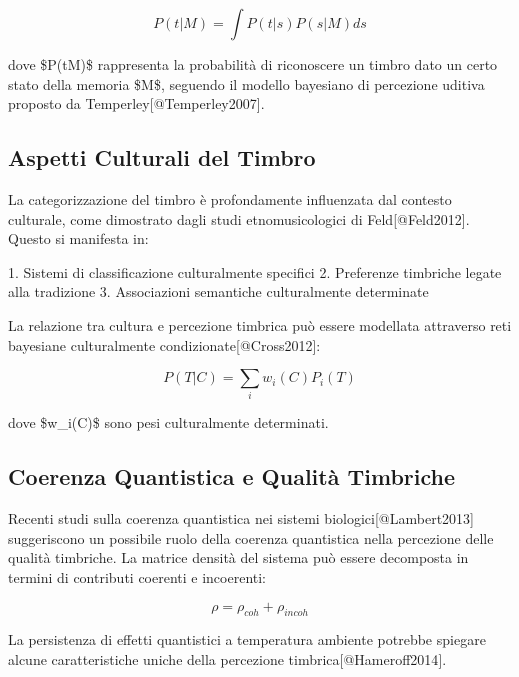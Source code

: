 \documentclass[a4paper,11pt]{article}
\begin{document}
\begin{displaymath}
P(t|M) = \int P(t|s)P(s|M)ds
\end{displaymath}

dove \$P(t\textbar{}M)\$ rappresenta la probabilità di riconoscere un timbro dato
un certo stato della memoria \$M\$, seguendo il modello bayesiano di
percezione uditiva proposto da Temperley{[}@Temperley2007{]}.

\subsection{Aspetti Culturali del Timbro}\hypertarget{aspetti-culturali-del-timbro}{}\label{aspetti-culturali-del-timbro}

La categorizzazione del timbro è profondamente influenzata dal contesto
culturale, come dimostrato dagli studi etnomusicologici di
Feld{[}@Feld2012{]}. Questo si manifesta in:

1. Sistemi di classificazione culturalmente specifici 2. Preferenze
timbriche legate alla tradizione 3. Associazioni semantiche
culturalmente determinate

La relazione tra cultura e percezione timbrica può essere modellata
attraverso reti bayesiane culturalmente condizionate{[}@Cross2012{]}:

\begin{displaymath}
P(T|C) = \sum_i w_i(C)P_i(T)
\end{displaymath}

dove \$w\_i(C)\$ sono pesi culturalmente determinati.

\subsection{Coerenza Quantistica e Qualità Timbriche}\hypertarget{coerenza-quantistica-e-qualit-timbriche}{}\label{coerenza-quantistica-e-qualit-timbriche}

Recenti studi sulla coerenza quantistica nei sistemi
biologici{[}@Lambert2013{]} suggeriscono un possibile ruolo della coerenza
quantistica nella percezione delle qualità timbriche. La matrice densità
del sistema può essere decomposta in termini di contributi coerenti e
incoerenti:

\begin{displaymath}
\rho = \rho_{coh} + \rho_{incoh}
\end{displaymath}

La persistenza di effetti quantistici a temperatura ambiente potrebbe
spiegare alcune caratteristiche uniche della percezione
timbrica{[}@Hameroff2014{]}.
\end{document}
